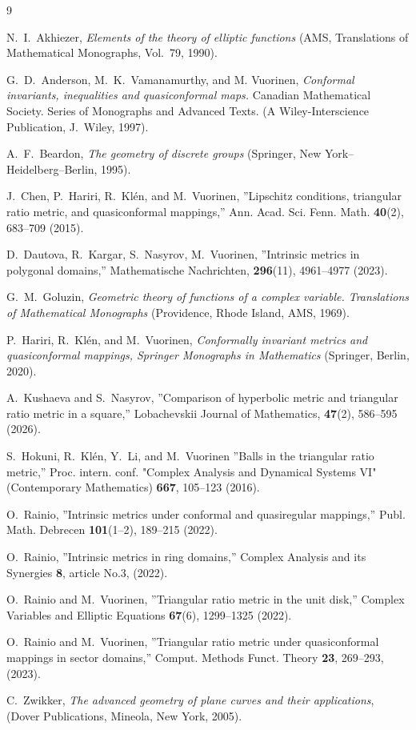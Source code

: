 \documentclass[12pt,a4paper]{amsart}
\begin{document}
\begin{thebibliography}{9}

N.~I.~Akhiezer, \emph{Elements of the theory of elliptic functions}
(AMS, Translations of Mathematical Monographs, Vol.~79,
1990).


G.~D.~Anderson, M.~K.~Vamanamurthy, and
M. Vuorinen,  \emph{Conformal invariants, inequalities and
quasiconformal maps.}   Canadian Mathematical Society. Series of Monographs and Advanced Texts. (A Wiley-Interscience Publication, J.~Wiley, 1997).

A.~F.~Beardon, \emph{The geometry of discrete groups} (Springer, New York--Heidelberg--Berlin, 1995).

J.~Chen, P.~Hariri,  R.~Kl\'en, and M.~Vuorinen,  ''Lipschitz conditions, triangular ratio
metric, and quasiconformal mappings,'' Ann. Acad. Sci. Fenn. Math. \textbf{40}(2), 683--709 (2015).


 D.~Dautova, R.~Kargar, S.~Nasyrov, M.~Vuorinen, ''Intrinsic metrics in polygonal domains,'' Mathematische Nachrichten, \textbf{296}(11), 4961--4977 (2023).

G.~M.~Goluzin, \emph{Geometric theory of functions of a complex variable. Translations of Mathematical Monographs} (Providence, Rhode Island, AMS, 1969). %

P.~Hariri, R.~Kl\'en, and M.~Vuorinen, \emph{Conformally invariant metrics and quasiconformal mappings, Springer Monographs
in Mathematics} (Springer, Berlin, 2020). %

A.~Kushaeva and S.~Nasyrov, ''Comparison of hyperbolic metric and triangular ratio metric
in a square,'' Lobachevskii Journal of Mathematics, \textbf{47}(2), 586--595 (2026).

S.~Hokuni, R.~Kl\'en, Y.~Li,  and M.~Vuorinen ''Balls in the triangular ratio metric,''
Proc. intern. conf. "Complex Analysis and Dynamical Systems VI"
(Contemporary Mathematics) \textbf{667},  105--123 (2016).

O.~Rainio, ''Intrinsic metrics under conformal and quasiregular mappings,'' Publ. Math. Debrecen \textbf{101}(1--2), 189--215 (2022).

O.~Rainio, ''Intrinsic metrics in ring domains,'' Complex Analysis and its Synergies \textbf{8}, article No.3, (2022).

O.~Rainio and M.~Vuorinen, ''Triangular ratio metric in the unit disk,''
Complex Variables and Elliptic Equations
\textbf{67}(6),  1299--1325 (2022).

O.~Rainio and M.~Vuorinen, ''Triangular ratio metric under quasiconformal mappings in sector domains,'' Comput. Methods
Funct. Theory \textbf{23},  269--293, (2023). %

C.~Zwikker, \emph{The advanced geometry of plane curves and their applications}, (Dover Publications, Mineola, New York, 2005).

\end{thebibliography}
\end{document}
